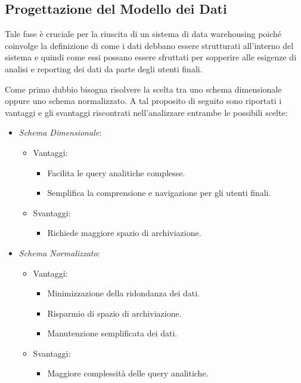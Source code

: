 \subsection{Progettazione del Modello dei Dati}

Tale fase è cruciale per la riuscita di un sistema di data warehousing poiché coinvolge la definizione di come i dati debbano essere strutturati all'interno del sistema e quindi come essi possano essere sfruttati per sopperire alle esigenze di analisi e reporting dei dati da parte degli utenti finali.

Come primo dubbio bisogna risolvere la scelta tra uno schema dimensionale oppure uno schema normalizzato. A tal proposito di seguito sono riportati i vantaggi e gli svantaggi riscontrati nell'analizzare entrambe le possibili scelte:

\begin{itemize}
    \item \textit{Schema Dimensionale}:
        \begin{itemize}
            \item Vantaggi:
                \begin{itemize}
                    \item Facilita le query analitiche complesse.
                    \item Semplifica la comprensione e navigazione per gli utenti finali.
                \end{itemize}
            \item Svantaggi:
                \begin{itemize}
                    \item Richiede maggiore spazio di archiviazione.
                \end{itemize}
        \end{itemize}
    \item \textit{Schema Normalizzato}:
            \begin{itemize}
            \item Vantaggi:
                \begin{itemize}
                    \item Minimizzazione della ridondanza dei dati.
                    \item Risparmio di spazio di archiviazione.
                    \item Manutenzione semplificata dei dati.
                \end{itemize}
            \item Svantaggi:
                \begin{itemize}
                    \item Maggiore complessità delle query analitiche.
                \end{itemize}
        \end{itemize}
\end{itemize}

